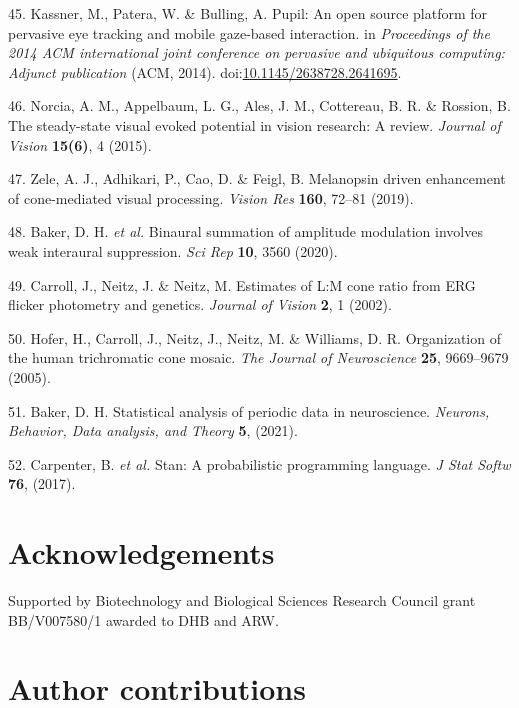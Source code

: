 \documentclass[
]{article}
\begin{document}
\leavevmode\hypertarget{ref-Kassner2014}{}%
45. Kassner, M., Patera, W. \& Bulling, A. Pupil: An open source platform for pervasive eye tracking and mobile gaze-based interaction. in \emph{Proceedings of the 2014 ACM international joint conference on pervasive and ubiquitous computing: Adjunct publication} (ACM, 2014). doi:\href{https://doi.org/10.1145/2638728.2641695}{10.1145/2638728.2641695}.

\leavevmode\hypertarget{ref-Norcia2015}{}%
46. Norcia, A. M., Appelbaum, L. G., Ales, J. M., Cottereau, B. R. \& Rossion, B. The steady-state visual evoked potential in vision research: A review. \emph{Journal of Vision} \textbf{15(6)}, 4 (2015).

\leavevmode\hypertarget{ref-Zele2019}{}%
47. Zele, A. J., Adhikari, P., Cao, D. \& Feigl, B. Melanopsin driven enhancement of cone-mediated visual processing. \emph{Vision Res} \textbf{160}, 72--81 (2019).

\leavevmode\hypertarget{ref-Baker2020}{}%
48. Baker, D. H. \emph{et al.} Binaural summation of amplitude modulation involves weak interaural suppression. \emph{Sci Rep} \textbf{10}, 3560 (2020).

\leavevmode\hypertarget{ref-Carroll2002}{}%
49. Carroll, J., Neitz, J. \& Neitz, M. Estimates of L:M cone ratio from ERG flicker photometry and genetics. \emph{Journal of Vision} \textbf{2}, 1 (2002).

\leavevmode\hypertarget{ref-Hofer2005}{}%
50. Hofer, H., Carroll, J., Neitz, J., Neitz, M. \& Williams, D. R. Organization of the human trichromatic cone mosaic. \emph{The Journal of Neuroscience} \textbf{25}, 9669--9679 (2005).

\leavevmode\hypertarget{ref-Baker2021}{}%
51. Baker, D. H. Statistical analysis of periodic data in neuroscience. \emph{Neurons, Behavior, Data analysis, and Theory} \textbf{5}, (2021).

\leavevmode\hypertarget{ref-Carpenter2017}{}%
52. Carpenter, B. \emph{et al.} Stan: A probabilistic programming language. \emph{J Stat Softw} \textbf{76}, (2017).

\hypertarget{acknowledgements}{%
\section{Acknowledgements}\label{acknowledgements}}

Supported by Biotechnology and Biological Sciences Research Council grant BB/V007580/1 awarded to DHB and ARW.

\hypertarget{author-contributions}{%
\section{Author contributions}\label{author-contributions}}
\end{document}
